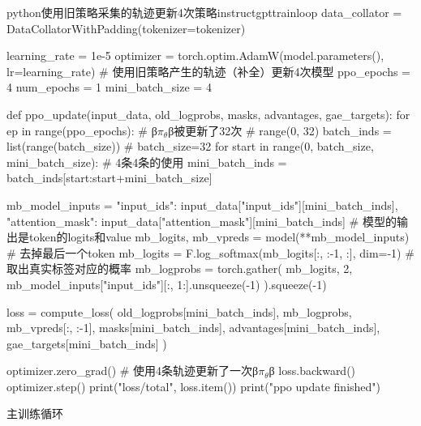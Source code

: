 \documentclass[lang=cn,newtx,10pt,scheme=chinese]{elegantbook}
\begin{document}
\begin{codebox}{python}{使用旧策略采集的轨迹更新4次策略}{instructgpttrainloop}
data_collator = DataCollatorWithPadding(tokenizer=tokenizer)

learning_rate = 1e-5
optimizer = torch.optim.AdamW(model.parameters(), lr=learning_rate)
# 使用旧策略产生的轨迹（补全）更新4次模型
ppo_epochs = 4
num_epochs = 1
mini_batch_size = 4

def ppo_update(input_data, old_logprobs, masks, advantages, gae_targets):
    for ep in range(ppo_epochs): # β$\pi_\theta$β被更新了32次
        # range(0, 32)
        batch_inds = list(range(batch_size)) # batch_size=32
        for start in range(0, batch_size, mini_batch_size):
            # 4条4条的使用
            mini_batch_inds = batch_inds[start:start+mini_batch_size]

            mb_model_inputs = {
                "input_ids": input_data["input_ids"][mini_batch_inds],
                "attention_mask": input_data["attention_mask"][mini_batch_inds]
            }
            # 模型的输出是token的logits和value
            mb_logits, mb_vpreds = model(**mb_model_inputs)
            # 去掉最后一个token
            mb_logits = F.log_softmax(mb_logits[:, :-1, :], dim=-1)
            # 取出真实标签对应的概率
            mb_logprobs = torch.gather(
                mb_logits,
                2,
                mb_model_inputs["input_ids"][:, 1:].unsqueeze(-1)
            ).squeeze(-1)

            loss = compute_loss(
                old_logprobs[mini_batch_inds],
                mb_logprobs,
                mb_vpreds[:, :-1],
                masks[mini_batch_inds],
                advantages[mini_batch_inds],
                gae_targets[mini_batch_inds]
            )

            optimizer.zero_grad()
            # 使用4条轨迹更新了一次β$\pi_\theta$β
            loss.backward()
            optimizer.step()
            print("loss/total", loss.item())
    print("ppo update finished")
\end{codebox}

主训练循环
\end{document}
